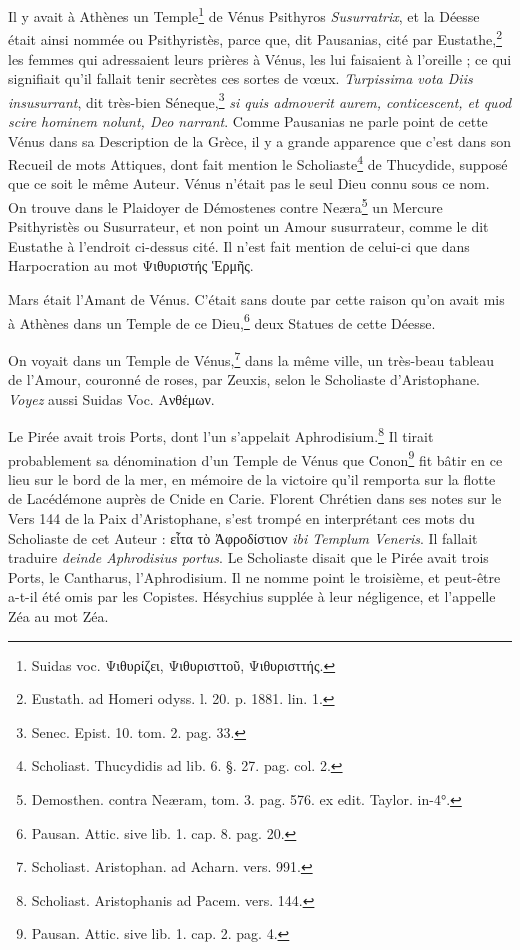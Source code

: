 \documentclass[a4paper, 11pt, oneside, polutonikogreek, french]{article}
\begin{document}
Il y avait à Athènes un Temple\footnote{Suidas voc. Ψιθυρίζει, Ψιθυρισττοῦ, Ψιθυρισττής.} de Vénus Psithyros \emph{Susurratrix}, et la Déesse était ainsi nommée ou Psithyristès, parce que, dit Pausanias, cité par Eustathe,\footnote{Eustath. ad Homeri odyss. l. 20. p. 1881. lin. 1.} les femmes qui adressaient leurs prières à Vénus, les lui faisaient à l'oreille ; ce qui signifiait qu'il fallait tenir secrètes ces sortes de vœux. \emph{Turpissima vota Diis insusurrant}, dit très-bien Séneque,\footnote{Senec. Epist. 10. tom. 2. pag. 33.} \emph{si quis admoverit aurem, conticescent, et quod scire hominem nolunt, Deo narrant}. Comme Pausanias ne parle point de cette Vénus dans sa Description de la Grèce, il y a grande apparence que c'est dans son Recueil de mots Attiques, dont fait mention le Scholiaste\footnote{Scholiast. Thucydidis ad lib. 6. §. 27. pag. col. 2.} de Thucydide, supposé que ce soit le même Auteur. Vénus n'était pas le seul Dieu connu sous ce nom. On trouve dans le Plaidoyer de Démostenes contre Neæra\footnote{Demosthen. contra Neæram, tom. 3. pag. 576. ex edit. Taylor. in-4°.} un Mercure Psithyristès ou Susurrateur, et non point un Amour susurrateur, comme le dit Eustathe à l'endroit ci-dessus cité. Il n'est fait mention de celui-ci que dans Harpocration au mot Ψιθυριστής Ἑρμῆς.

Mars était l'Amant de Vénus. C'était sans doute par cette raison qu'on avait mis à Athènes dans un Temple de ce Dieu,\footnote{Pausan. Attic. sive lib. 1. cap. 8. pag. 20.} deux Statues de cette Déesse.

On voyait dans un Temple de Vénus,\footnote{Scholiast. Aristophan. ad Acharn. vers. 991.} dans la même ville, un très-beau tableau de l'Amour, couronné de roses, par Zeuxis, selon le Scholiaste d'Aristophane. \emph{Voyez} aussi Suidas Voc. Ανθέμων.

Le Pirée avait trois Ports, dont l'un s'appelait Aphrodisium.\footnote{Scholiast. Aristophanis ad Pacem. vers. 144.} Il tirait probablement sa dénomination d'un Temple de Vénus que Conon\footnote{Pausan. Attic. sive lib. 1. cap. 2. pag. 4.} fit bâtir en ce lieu sur le bord de la mer, en mémoire de la victoire qu'il remporta sur la flotte de Lacédémone auprès de Cnide en Carie. Florent Chrétien dans ses notes sur le Vers 144 de la Paix d'Aristophane, s'est trompé en interprétant ces mots du Scholiaste de cet Auteur : εἶτα τὸ Ἀφροδίστιον \emph{ibi Templum Veneris}. Il fallait traduire \emph{deinde Aphrodisius portus}. Le Scholiaste disait que le Pirée avait trois Ports, le Cantharus, l'Aphrodisium. Il ne nomme point le troisième, et peut-être a-t-il été omis par les Copistes. Hésychius supplée à leur négligence, et l'appelle Zéa au mot Zéa.
\end{document}
